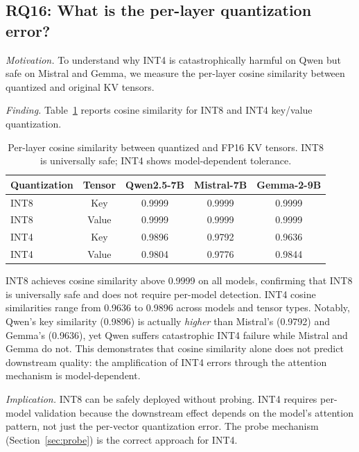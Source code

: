 \documentclass[11pt]{article}
\theoremstyle{definition}
\theoremstyle{plain}
\begin{document}
\subsection{RQ16: What is the per-layer quantization error?}
\label{sec:rq16}
\label{sec:exp3}

\emph{Motivation.}  To understand why INT4 is catastrophically harmful on Qwen but safe on Mistral and Gemma, we measure the per-layer cosine similarity between quantized and original KV tensors.

\emph{Finding.}  Table~\ref{tab:quant-error} reports cosine similarity for INT8 and INT4 key/value quantization.

\begin{table}[t]
\centering
\caption{Per-layer cosine similarity between quantized and FP16 KV tensors.  INT8 is universally safe; INT4 shows model-dependent tolerance.}
\label{tab:quant-error}
\small
\begin{tabular}{lcccc}
\toprule
Quantization & Tensor & Qwen2.5-7B & Mistral-7B & Gemma-2-9B \\
\midrule
INT8 & Key & 0.9999 & 0.9999 & 0.9999 \\
INT8 & Value & 0.9999 & 0.9999 & 0.9999 \\
\midrule
INT4 & Key & 0.9896 & 0.9792 & 0.9636 \\
INT4 & Value & 0.9804 & 0.9776 & 0.9844 \\
\bottomrule
\end{tabular}
\end{table}

INT8 achieves cosine similarity above 0.9999 on all models, confirming that INT8 is universally safe and does not require per-model detection.  INT4 cosine similarities range from 0.9636 to 0.9896 across models and tensor types.  Notably, Qwen's key similarity (0.9896) is actually \emph{higher} than Mistral's (0.9792) and Gemma's (0.9636), yet Qwen suffers catastrophic INT4 failure while Mistral and Gemma do not.  This demonstrates that cosine similarity alone does not predict downstream quality: the amplification of INT4 errors through the attention mechanism is model-dependent.

\emph{Implication.}  INT8 can be safely deployed without probing.  INT4 requires per-model validation because the downstream effect depends on the model's attention pattern, not just the per-vector quantization error.  The probe mechanism (Section~\ref{sec:probe}) is the correct approach for INT4.
\end{document}
